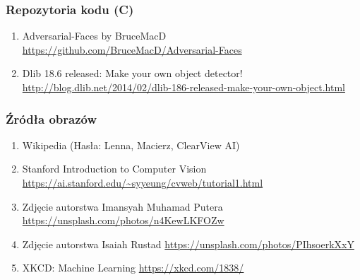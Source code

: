 \documentclass{beamer}
\begin{document}
            \begin{frame}
                \frametitle{Repozytoria kodu (C)}
                \begin{enumerate}
                    \item Adversarial-Faces by BruceMacD
                        \url{https://github.com/BruceMacD/Adversarial-Faces}
                    \item Dlib 18.6 released: Make your own object detector!
                        \url{http://blog.dlib.net/2014/02/dlib-186-released-make-your-own-object.html}
                \end{enumerate}
            \end{frame}

            \begin{frame}
                \frametitle{Źródła obrazów}
                \begin{enumerate}
                    \item Wikipedia (Hasła: Lenna, Macierz, ClearView AI)
                    \item Stanford Introduction to Computer Vision
                        \url{https://ai.stanford.edu/~syyeung/cvweb/tutorial1.html}
                    \item Zdjęcie autorstwa Imansyah Muhamad Putera
                        \url{https://unsplash.com/photos/n4KewLKFOZw}
                    \item Zdjęcie autorstwa Isaiah Rustad
                        \url{https://unsplash.com/photos/PIhsoerkXxY}
                    \item XKCD: Machine Learning
                        \url{https://xkcd.com/1838/}
                \end{enumerate}
            \end{frame}
\end{document}
